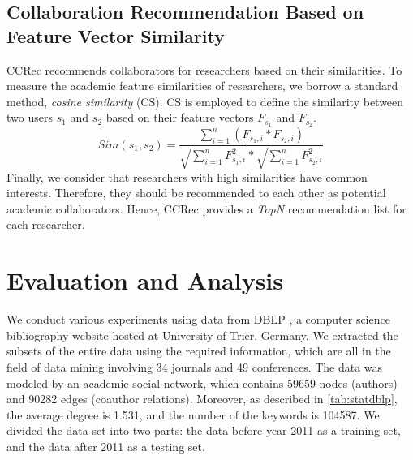 \subsection*{Collaboration Recommendation Based on Feature Vector Similarity}
CCRec recommends collaborators for researchers based on their similarities. To measure the academic feature similarities of researchers, we borrow a standard method, \emph{cosine similarity} (CS). CS is employed to define the similarity between two users $s_{1}$ and $s_{2}$ based on their feature vectors $F_{s_{1}}$ and $F_{s_{2}}$.
\begin{equation}
Sim(s_{1},s_{2})=\frac{\sum_{i=1}^{n}(F_{s_{1},i}*F_{s_{2},i})}{\sqrt{\sum_{i=1}^{n}F_{s_{1},i}^2}*\sqrt{\sum_{i=1}^{n}F_{s_{2},i}^2}}
\end{equation}
Finally, we consider that researchers with high similarities have common interests. Therefore, they should be recommended to each other as potential academic collaborators. Hence, CCRec provides a \emph{TopN} recommendation list for each researcher.

\section*{Evaluation and Analysis}
We conduct various experiments using data from DBLP \cite{Ley:DBLP}, a computer science bibliography website hosted at University of Trier, Germany. We extracted the subsets of the entire data using the required information, which are all in the field of data mining involving 34 journals and 49 conferences. The data was modeled by an academic social network, which contains 59659 nodes (authors) and 90282 edges (coauthor relations). Moreover, as described in \autoref{tab:statdblp}, the average degree is 1.531, and the number of the keywords is 104587. We divided the data set into two parts: the data before year 2011 as a training set, and the data after 2011 as a testing set.

